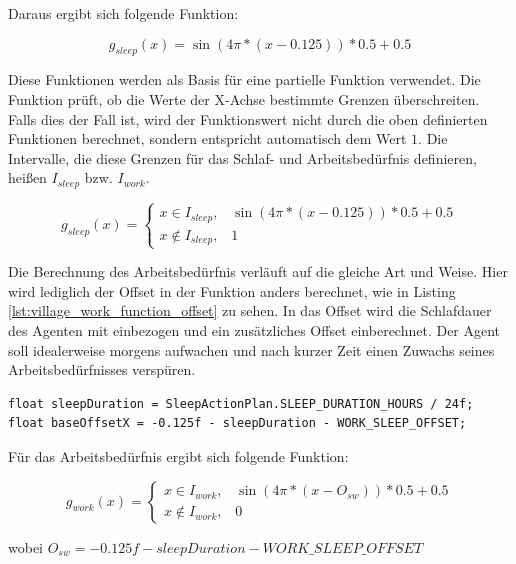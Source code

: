 Daraus ergibt sich folgende Funktion:

$$ g_{sleep}(x) =  \sin{(4 \pi * (x - 0.125))} * 0.5 + 0.5  $$

Diese Funktionen werden als Basis für eine partielle Funktion verwendet. Die Funktion  prüft, ob die Werte der X-Achse bestimmte Grenzen überschreiten. Falls dies der Fall ist, wird der Funktionswert nicht durch die oben definierten Funktionen berechnet, sondern entspricht automatisch dem Wert $1$. Die Intervalle, die diese Grenzen für das Schlaf- und Arbeitsbedürfnis definieren, heißen $I_{sleep}$ bzw. $I_{work}$.

$$ g_{sleep}(x)= \left\{
    \begin{array}{ll}
        x \in I_{sleep},     \;\;\;     \sin{(4 \pi * (x - 0.125))} * 0.5 + 0.5     \\
        x \not\in I_{sleep}, \;\;\;   1
    \end{array}
\right.  $$

Die Berechnung des Arbeitsbedürfnis verläuft auf die gleiche Art und Weise. Hier wird lediglich der Offset in der Funktion anders berechnet, wie in Listing \ref{lst:village_work_function_offset} zu sehen. In das Offset wird die Schlafdauer des Agenten mit einbezogen und ein zusätzliches Offset einberechnet. Der Agent soll idealerweise morgens aufwachen und nach kurzer Zeit einen Zuwachs seines Arbeitsbedürfnisses verspüren.

\begin{minipage}{\linewidth}
\begin{lstlisting}[linewidth=16.4cm, label=lst:village_work_function_offset, caption=Berechnung des Offset für das Arbeitsbedürfnis, xleftmargin=1cm]
float sleepDuration = SleepActionPlan.SLEEP_DURATION_HOURS / 24f;
float baseOffsetX = -0.125f - sleepDuration - WORK_SLEEP_OFFSET;
\end{lstlisting}
\end{minipage}

Für das Arbeitsbedürfnis ergibt sich folgende Funktion:

$$ g_{work}(x)= \left\{
    \begin{array}{ll}
        x \in I_{work},     \;\;\;     \sin{(4 \pi * (x - O_{sw}))} * 0.5 + 0.5     \\
        x \not\in I_{work}, \;\;\;   0
    \end{array}
\right.  $$
\begin{centering}  wobei $ O_{sw} = -0.125f - sleepDuration - WORK\_SLEEP\_OFFSET $  \end{centering}
\bigskip

